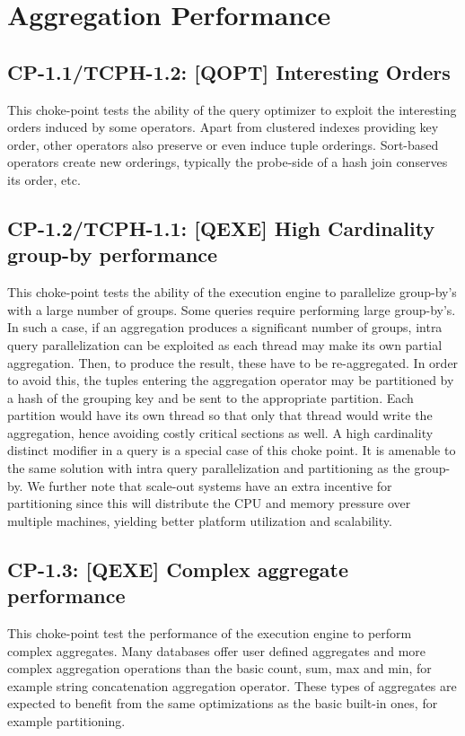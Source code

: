 \section{Aggregation Performance}

\subsection*{CP-1.1/TCPH-1.2: [QOPT]  Interesting Orders}
\label{choke_point_1.1}
This choke-point tests the ability of the query optimizer to exploit the interesting orders induced by some operators. Apart from clustered indexes providing key order, other operators also preserve or even induce tuple orderings.
Sort-based operators create new orderings, typically the probe-side of a hash join conserves its order, etc.



\subsection*{CP-1.2/TCPH-1.1: [QEXE] High Cardinality group-by performance}
\label{choke_point_1.2}
This choke-point tests the ability of the execution engine to parallelize group-by's with a large number of groups. Some queries require performing large group-by's.
In such a case, if an aggregation produces a significant number of groups, intra query parallelization can be exploited as each thread may make its own partial aggregation.
Then, to produce the result, these have to be re-aggregated. In order to avoid this, the tuples entering the aggregation operator may be partitioned by a hash of the grouping key and be sent to the appropriate partition.
Each partition would have its own thread so that only that thread would write the aggregation, hence avoiding costly critical sections as well. A high cardinality distinct modifier in a query is a special case of this choke point.
It is amenable to the same solution with intra query parallelization and partitioning as the group-by.
We further note that scale-out systems have an extra incentive for partitioning since this will distribute the CPU and memory pressure over multiple machines, yielding better platform utilization and scalability.



\subsection*{CP-1.3: [QEXE] Complex aggregate performance}
\label{choke_point_1.3}
This choke-point test the performance of the execution engine to perform complex aggregates. Many databases offer user defined aggregates and more complex aggregation operations than the basic count, sum, max and min, for example string concatenation aggregation operator. These types of aggregates are expected to benefit from the same optimizations as the basic built-in ones, for example partitioning.

